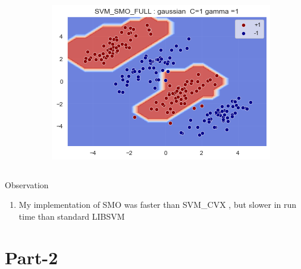 \documentclass[12pt,t]{beamer}
\begin{document}
\begin{frame}
\begin{columns}[]
\begin{column}[]{0.34\linewidth}
        \end{column}
        \begin{column}[]{0.34\linewidth}
            \includegraphics[width=\linewidth]{images/p1c/gausian_results.png}
        \end{column}
    \end{columns}

    \scriptsize
    \begin{block}{Observation}
        \begin{enumerate}
            \item My implementation of SMO was faster than SVM\_CVX , but slower in run time than standard
            LIBSVM  
        \end{enumerate}
    \end{block}

\end{frame}

\section{Part-2}
\end{document}
